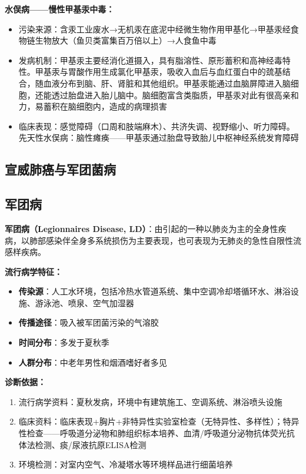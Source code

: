 \begin{keybox}
\textbf{水俣病——慢性甲基汞中毒：}
\begin{itemize}[leftmargin=*]
    \item 污染来源：含汞工业废水→无机汞在底泥中经微生物作用甲基化→甲基汞经食物链生物放大（鱼贝类富集百万倍以上）→人食鱼中毒
    \item 发病机制：甲基汞主要经消化道摄入，具有脂溶性、原形蓄积和高神经毒特性。甲基汞与胃酸作用生成氯化甲基汞，吸收入血后与血红蛋白中的巯基结合，随血液分布到脑、肝、肾脏和其他组织。甲基汞能通过血脑屏障进入脑细胞，还能透过胎盘进入胎儿脑中。脑细胞富含类脂质，甲基汞对此有很高亲和力，易蓄积在脑细胞内，造成的病理损害
    \item 临床表现：感觉障碍（口周和肢端麻木）、共济失调、视野缩小、听力障碍。先天性水俣病：脑性瘫痪——甲基汞通过胎盘导致胎儿中枢神经系统发育障碍
\end{itemize}
\end{keybox}

\subsection{宣威肺癌与军团菌病}

\subsection{军团病}

\begin{keybox}
\textbf{军团病（Legionnaires Disease, LD）}：由引起的一种以肺炎为主的全身性疾病，以肺部感染伴全身多系统损伤为主要表现，也可表现为无肺炎的急性自限性流感样疾病。

\textbf{流行病学特征：}
\begin{itemize}[leftmargin=*]
    \item \textbf{传染源}：人工水环境，包括冷热水管道系统、集中空调冷却塔循环水、淋浴设施、游泳池、喷泉、空气加湿器
    \item \textbf{传播途径}：吸入被军团菌污染的气溶胶
    \item \textbf{时间分布}：多发于夏秋季
    \item \textbf{人群分布}：中老年男性和烟酒嗜好者多见
\end{itemize}

\textbf{诊断依据：}
\begin{enumerate}[leftmargin=*]
    \item 流行病学资料：夏秋发病，环境中有建筑施工、空调系统、淋浴喷头设施
    \item 临床资料：临床表现+胸片+非特异性实验室检查（无特异性、多样性）；特异性检查——呼吸道分泌物和肺组织标本培养、血清/呼吸道分泌物抗体荧光抗体法检测、痰/尿液抗原ELISA检测
    \item 环境检测：对室内空气、冷凝塔水等环境样品进行细菌培养
\end{enumerate}
\end{keybox}

